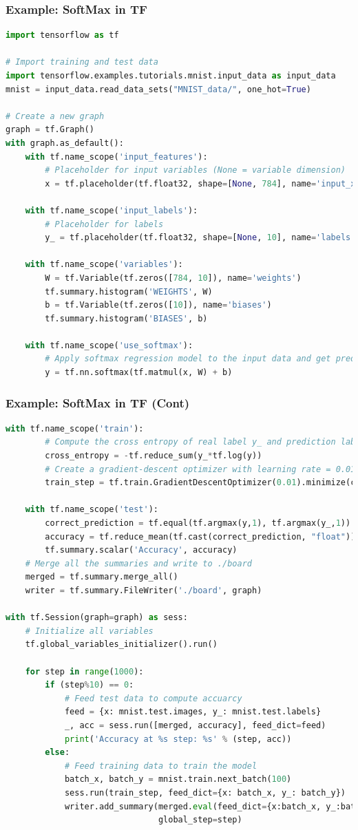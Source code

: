 \begin{frame}[fragile]
  \MyLogo
  \frametitle{Example: SoftMax in TF}  
 
\scriptsize{
\begin{lstlisting}[language=python]
import tensorflow as tf

# Import training and test data
import tensorflow.examples.tutorials.mnist.input_data as input_data
mnist = input_data.read_data_sets("MNIST_data/", one_hot=True)

# Create a new graph
graph = tf.Graph()
with graph.as_default():
	with tf.name_scope('input_features'):
		# Placeholder for input variables (None = variable dimension)
		x = tf.placeholder(tf.float32, shape=[None, 784], name='input_x')
							
	with tf.name_scope('input_labels'):
		# Placeholder for labels
		y_ = tf.placeholder(tf.float32, shape=[None, 10], name='labels')
							
	with tf.name_scope('variables'):
		W = tf.Variable(tf.zeros([784, 10]), name='weights')
		tf.summary.histogram('WEIGHTS', W)
		b = tf.Variable(tf.zeros([10]), name='biases')
		tf.summary.histogram('BIASES', b)
			
	with tf.name_scope('use_softmax'):
		# Apply softmax regression model to the input data and get prediction y
		y = tf.nn.softmax(tf.matmul(x, W) + b)
\end{lstlisting}
}
\end{frame}

\begin{frame}[fragile]
  \MyLogo
  \frametitle{Example: SoftMax in TF (Cont)}  

\ContinueLineNumber
\scriptsize{
\begin{lstlisting}[language=python]
	with tf.name_scope('train'):
		# Compute the cross entropy of real label y_ and prediction labe y
		cross_entropy = -tf.reduce_sum(y_*tf.log(y))
		# Create a gradient-descent optimizer with learning rate = 0.01
		train_step = tf.train.GradientDescentOptimizer(0.01).minimize(cross_entropy)

	with tf.name_scope('test'):
		correct_prediction = tf.equal(tf.argmax(y,1), tf.argmax(y_,1))
		accuracy = tf.reduce_mean(tf.cast(correct_prediction, "float"))
		tf.summary.scalar('Accuracy', accuracy)
	# Merge all the summaries and write to ./board
	merged = tf.summary.merge_all()
	writer = tf.summary.FileWriter('./board', graph)
	
with tf.Session(graph=graph) as sess:
	# Initialize all variables
	tf.global_variables_initializer().run()
	
	for step in range(1000):
		if (step%10) == 0:
			# Feed test data to compute accuarcy
			feed = {x: mnist.test.images, y_: mnist.test.labels}
			_, acc = sess.run([merged, accuracy], feed_dict=feed)
			print('Accuracy at %s step: %s' % (step, acc))
		else:
			# Feed training data to train the model
			batch_x, batch_y = mnist.train.next_batch(100)
			sess.run(train_step, feed_dict={x: batch_x, y_: batch_y})
			writer.add_summary(merged.eval(feed_dict={x:batch_x, y_:batch}),
							   global_step=step)
\end{lstlisting}
}

\end{frame}
